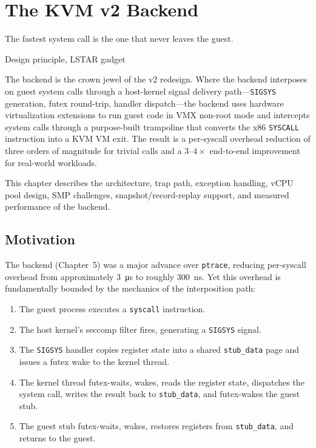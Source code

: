 \chapter{The KVM v2 Backend}
\label{ch:kvm}

\epigraph{%
  The fastest system call is the one that never leaves the guest.%
}{Design principle, LSTAR gadget}

The \KVMvTwo{} backend is the crown jewel of the v2 redesign.  Where the
\Seccomp{} backend interposes on guest system calls through a host-kernel
signal delivery path---\texttt{SIGSYS} generation, futex round-trip, handler
dispatch---the \KVMvTwo{} backend uses hardware virtualization extensions to
run guest code in VMX non-root mode and intercepts system calls through a
purpose-built trampoline that converts the x86 \texttt{SYSCALL} instruction
into a KVM VM exit.  The result is a per-syscall overhead reduction of three
orders of magnitude for trivial calls and a $3$--$4\times$ end-to-end
improvement for real-world workloads.

This chapter describes the architecture, trap path, exception handling,
vCPU pool design, SMP challenges, snapshot/record-replay support, and
measured performance of the \KVMvTwo{} backend.


\section{Motivation}
\label{sec:kvm-motivation}

The \Seccomp{} backend (Chapter~5) was a major advance over \texttt{ptrace},
reducing per-syscall overhead from approximately \SI{3}{\micro\second} to
roughly \SI{300}{\nano\second}.  Yet this overhead is fundamentally bounded
by the mechanics of the interposition path:

\begin{enumerate}[leftmargin=2em]
  \item The guest process executes a \texttt{syscall} instruction.
  \item The host kernel's seccomp filter fires, generating a \texttt{SIGSYS}
        signal.
  \item The \texttt{SIGSYS} handler copies register state into a shared
        \texttt{stub\_data} page and issues a futex wake to the \UML{} kernel
        thread.
  \item The \UML{} kernel thread futex-waits, wakes, reads the register state,
        dispatches the system call, writes the result back to
        \texttt{stub\_data}, and futex-wakes the guest stub.
  \item The guest stub futex-waits, wakes, restores registers from
        \texttt{stub\_data}, and returns to the guest.
\end{enumerate}

